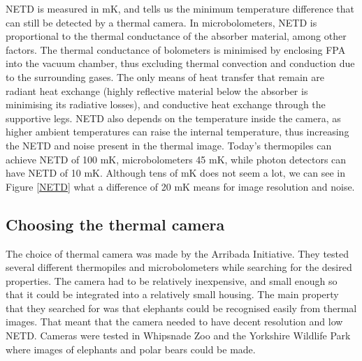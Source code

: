 NETD is measured in \si{\milli\kelvin}, and tells us the minimum temperature difference that can still be detected by a thermal camera.
In microbolometers, NETD is proportional to the thermal conductance of the absorber material, among other factors\cite{thermal_book}.
The thermal conductance of bolometers is minimised by enclosing FPA into the vacuum chamber, thus excluding thermal convection and conduction due to the surrounding gases.
The only means of heat transfer that remain are radiant heat exchange (highly reflective material below the absorber is minimising its radiative losses), and conductive heat exchange through the supportive legs.
NETD also depends on the temperature inside the camera, as higher ambient temperatures can raise the internal temperature, thus increasing the NETD and noise present in the thermal image.
Today's thermopiles can achieve NETD of 100 \si{\milli\kelvin}, microbolometers 45 \si{\milli\kelvin}, while photon detectors can have NETD of 10 \si{\milli\kelvin}.
Although tens of \si{\milli\kelvin} does not seem a lot, we can see in Figure \ref{NETD} what a difference of 20 \si{\milli\kelvin} means for image resolution and noise.

\subsection{ Choosing the thermal camera} \label{choosing_thermal}

The choice of thermal camera was made by the Arribada Initiative\cite{thermal_comparison}.
They tested several different thermopiles and microbolometers while searching for the desired properties.
The camera had to be relatively inexpensive, and small enough so that it could be integrated into a relatively small housing.
The main property that they searched for was that elephants could be recognised easily from thermal images.
That meant that the camera needed to have decent resolution and low NETD.
Cameras were tested in Whipsnade Zoo and the Yorkshire Wildlife Park where images of elephants and polar bears could be made.

